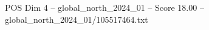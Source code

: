 \begin{textsample}{POS Dim 4 – global\_north\_2024\_01 – Score 18.00 – global\_north\_2024\_01/105517464.txt}
\end{textsample}

